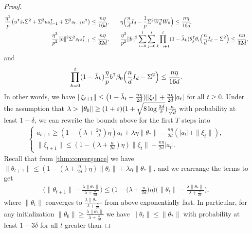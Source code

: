 \begin{proof}
    \begin{align*}
        \frac{\eta^2}{p}\big(u\transpose \tilde{s}_t \Sigma^2 + \Sigma^2 u s_{t-1}\transpose + \Sigma^2 s_{t-1}u\transpose\big) \leq \frac{n\eta}{16d},& \qquad \eta\Big(\frac{n}{d}I_d - \frac{1}{p}\Sigma^2 W_0\transpose W_0\Big) \leq \frac{n\eta}{16d}, \\
        \frac{\eta^3}{p^2}\|b\|^2 \Sigma^2 s_{t}s_{t-1}\transpose \leq \frac{n\eta}{32d},& \qquad \frac{\eta^3}{p^2}\|b\|^2\sum_{i=0}^t\sum_{j=0}^i\prod_{k=i+1}^t(1-\tilde\lambda_k)\theta_j\transpose \theta_i \Big(\frac{n}{d}I_d-\Sigma^2\Big) \leq \frac{n\eta}{32d},
    \end{align*}
    and 
    \begin{align*}
        \prod_{k=0}^t (1-\tilde\lambda_k)\frac{\eta}{p}b\transpose\beta_0 \Big(\frac{n}{d}I_d - \Sigma^2\Big) \leq \frac{n\eta}{16d}.
    \end{align*}
    In other words, we have $\|\xi_{t+1}\| \leq \big(1-\tilde{\lambda}_t - \frac{n\eta}{2d})\|\xi_t\| + \frac{n\eta}{2d}|a_t|$ for all $t\geq 0$. Under the assumption that $\lambda > \|\theta_0\|\geq (1+\varepsilon)(1 + \sqrt{8\log\frac{2d}{\delta}}) \frac{n}{\sqrt{d}}$ with probability at least $1-\delta$, we can rewrite the bounds above for the first $T$ steps into
    \begin{align*}
        \begin{cases}
            a_{t+1}\geq (1-(\lambda+\frac{2n}{d})\eta)a_t+\lambda\eta\|\theta_*\| - \frac{n\eta}{2d} (|a_t| + \|\xi_t\|), \\
            \|\xi_{t+1}\| \leq (1-(\lambda+\frac{n}{2d})\eta)\|\xi_t\| + \frac{n\eta}{2d} |a_t|.
        \end{cases}
    \end{align*}
    Recall that from \cref{thm:convergence} we have $\|\theta_{t+1}\| \leq (1-(\lambda + \frac{n}{2d})\eta )\|\theta_t\| + \lambda\eta\|\theta_\ast\|$, and we rearrange the terms to get
    \begin{align*}
        \Big(\|\theta_{t+1}\| - \frac{\lambda\|\theta_*\|}{\lambda + \frac{n}{2d}}\Big) \leq \Big(1-\Big(\lambda + \frac{n}{2d}\Big)\eta \Big) \Big(\|\theta_t\|  - \frac{\lambda\|\theta_*\|}{\lambda + \frac{n}{2d}}\Big),
    \end{align*}
    where $\|\theta_t\|$ converges to $\frac{\lambda\|\theta_*\|}{\lambda + \frac{n}{2d}}$ from above exponentially fast. 
    In particular, for any initialization $\|\theta_0\| \geq \frac{\lambda\|\theta_*\|}{\lambda + \frac{n}{2d}}$ we have $\|\theta_t\|\leq \|\theta_*\|$ with probability at least $1-3\delta$ for all $t$ greater than

\end{proof}
